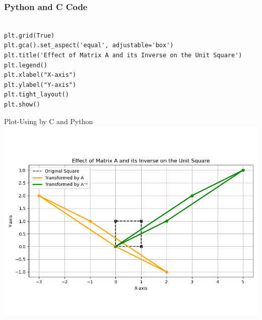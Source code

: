 \documentclass{beamer}
\begin{document}
\begin{frame}[fragile]
\frametitle{Python and C Code}

\begin{lstlisting}

plt.grid(True)
plt.gca().set_aspect('equal', adjustable='box')
plt.title('Effect of Matrix A and its Inverse on the Unit Square')
plt.legend()
plt.xlabel("X-axis")
plt.ylabel("Y-axis")
plt.tight_layout()
plt.show()
  \end{lstlisting}
\end{frame}

\begin{frame}{Plot-Using by C and Python}
    \centering
    \includegraphics[width=\columnwidth, height=0.8\textheight, keepaspectratio]{Figs/fig11.1.png}     
\end{frame}
\end{document}
